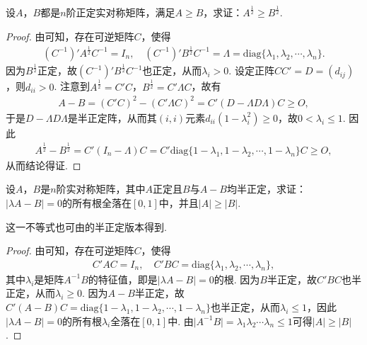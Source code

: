 \documentclass[../../main.tex]{subfiles}
\begin{document}
\begin{example}\label{example:例9.79}
设\(A\)，\(B\)都是\(n\)阶正定实对称矩阵，满足\(A\geqslant  B\)，求证：\(A^{\frac{1}{2}}\geqslant  B^{\frac{1}{2}}\).
\end{example}
\begin{proof}
由可知，存在可逆矩阵\(C\)，使得
\begin{align*}
(C^{-1})'A^{\frac{1}{2}}C^{-1} = I_n,\quad (C^{-1})'B^{\frac{1}{2}}C^{-1} = \Lambda = \mathrm{diag}\{\lambda_1,\lambda_2,\cdots,\lambda_n\}.
\end{align*}
因为\(B^{\frac{1}{2}}\)正定，故\((C^{-1})'B^{\frac{1}{2}}C^{-1}\)也正定，从而\(\lambda_i>0\). 设定正阵\(CC' = D=(d_{ij})\)，则\(d_{ii}>0\). 注意到\(A^{\frac{1}{2}} = C'C\)，\(B^{\frac{1}{2}} = C'\Lambda C\)，故有
\begin{align*}
A - B=(C'C)^2-(C'\Lambda C)^2 = C'(D - \Lambda D\Lambda)C\geqslant  O,
\end{align*}
于是\(D - \Lambda D\Lambda\)是半正定阵，从而其\((i,i)\)元素\(d_{ii}(1 - \lambda_i^2)\geqslant 0\)，故\(0<\lambda_i\leqslant 1\). 因此
\begin{align*}
A^{\frac{1}{2}} - B^{\frac{1}{2}} = C'(I_n - \Lambda)C = C'\mathrm{diag}\{1 - \lambda_1,1 - \lambda_2,\cdots,1 - \lambda_n\}C\geqslant  O,
\end{align*}
从而结论得证.

\end{proof}

\begin{example}\label{example:例9.80}
设\(A\)，\(B\)是\(n\)阶实对称矩阵，其中\(A\)正定且\(B\)与\(A - B\)均半正定，求证：\(\vert\lambda A - B\vert = 0\)的所有根全落在\([0,1]\)中，并且\(\vert A\vert\geqslant \vert B\vert\).
\end{example}
\begin{remark}
这一不等式也可由的半正定版本得到.
\end{remark}
\begin{proof}
由可知，存在可逆矩阵\(C\)，使得
\begin{align*}
C'AC = I_n,\quad C'BC = \mathrm{diag}\{\lambda_1,\lambda_2,\cdots,\lambda_n\},
\end{align*}
其中\(\lambda_i\)是矩阵\(A^{-1}B\)的特征值，即是\(\vert\lambda A - B\vert = 0\)的根. 因为\(B\)半正定，故\(C'BC\)也半正定，从而\(\lambda_i\geqslant 0\). 因为\(A - B\)半正定，故\(C'(A - B)C = \mathrm{diag}\{1 - \lambda_1,1 - \lambda_2,\cdots,1 - \lambda_n\}\)也半正定，从而\(\lambda_i\leqslant 1\)，因此\(\vert\lambda A - B\vert = 0\)的所有根\(\lambda_i\)全落在\([0,1]\)中. 由\(\vert A^{-1}B\vert=\lambda_1\lambda_2\cdots\lambda_n\leqslant 1\)可得\(\vert A\vert\geqslant \vert B\vert\). 

\end{proof}
\end{document}

